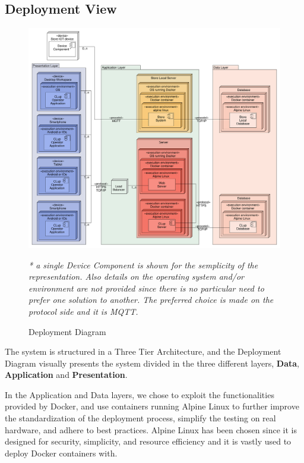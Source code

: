 \clearpage

\subsection{Deployment View}
\begin{figure}[H]
    \hspace*{-0.6cm}
    \includegraphics[width=1.1\textwidth]{Images/UML_deployment_diagram.pdf}
    \caption{\label{fig:UML_deployment_diagram}{Deployment Diagram}}
    \small\textit{* a single Device Component is shown for the semplicity of the representation. Also details on the operating system and/or environment are not provided since there is no particular need to prefer one solution to another. The preferred choice is made on the protocol side and it is MQTT.}
\end{figure}

The system is structured in a Three Tier Architecture, and the Deployment Diagram visually presents the system divided in the three different layers, \textbf{Data}, \textbf{Application} and \textbf{Presentation}.

In the Application and Data layers, we chose to exploit the functionalities provided by Docker, and use containers running Alpine Linux to further improve the standardization of the deployment process, simplify the testing on real hardware, and adhere to best practices. Alpine Linux has been chosen since it is designed for security, simplicity, and resource efficiency and it is vastly used to deploy Docker containers with.

